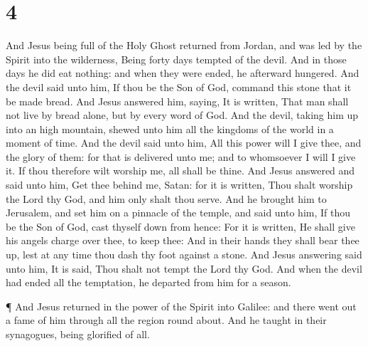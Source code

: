 \hypertarget{section-3}{%
\section{4}\label{section-3}}

 And Jesus being full of the Holy Ghost returned from
Jordan, and was led by the Spirit into the wilderness, 
Being forty days tempted of the devil. And in those days he did eat
nothing: and when they were ended, he afterward hungered. 
And the devil said unto him, If thou be the Son of God, command this
stone that it be made bread.  And Jesus answered him,
saying, It is written, That man shall not live by bread alone, but by
every word of God.  And the devil, taking him up into an
high mountain, shewed unto him all the kingdoms of the world in a moment
of time.  And the devil said unto him, All this power will I
give thee, and the glory of them: for that is delivered unto me; and to
whomsoever I will I give it.  If thou therefore wilt worship
me, all shall be thine.  And Jesus answered and said unto
him, Get thee behind me, Satan: for it is written, Thou shalt worship
the Lord thy God, and him only shalt thou serve.  And he
brought him to Jerusalem, and set him on a pinnacle of the temple, and
said unto him, If thou be the Son of God, cast thyself down from hence:
 For it is written, He shall give his angels charge over
thee, to keep thee:  And in their hands they shall bear
thee up, lest at any time thou dash thy foot against a stone.
 And Jesus answering said unto him, It is said, Thou shalt
not tempt the Lord thy God.  And when the devil had ended
all the temptation, he departed from him for a season.

 ¶ And Jesus returned in the power of the Spirit into
Galilee: and there went out a fame of him through all the region round
about.  And he taught in their synagogues, being glorified
of all.


